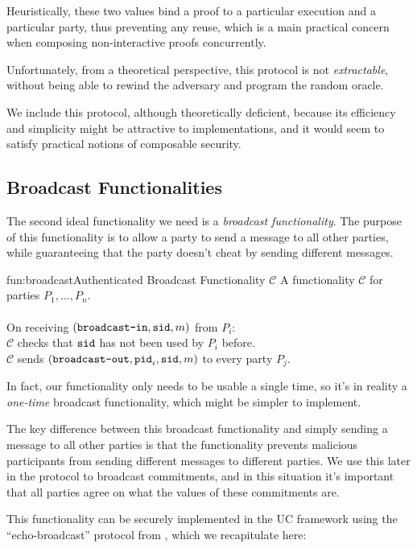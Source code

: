 Heuristically, these two values bind a proof to a particular execution
and a particular party, thus preventing any reuse,
which is a main practical concern when composing non-interactive
proofs concurrently.

Unfortunately, from a theoretical perspective, this protocol
is not \emph{extractable}, without being able to rewind the adversary
and program the random oracle.

We include this protocol, although theoretically deficient,
because its efficiency and simplicity might be attractive
to implementations, and it would seem to satisfy practical
notions of composable security.

\subsection{Broadcast Functionalities}

The second ideal functionality we need is a \emph{broadcast functionality}.
The purpose of this functionality is to allow a party to send a message
to all other parties, while guaranteeing that the party doesn't cheat
by sending different messages.

\begin{afunctionality}{fun:broadcast}{Authenticated Broadcast Functionality $\mathcal{C}$}
A functionality $\mathcal{C}$ for parties $P_1, \ldots, P_n$.\\
\\
On receiving $(\texttt{broadcast-in}, \texttt{sid}, m)$ from $P_i$:\\
$\mathcal{C}$ checks that $\texttt{sid}$ has not been used by $P_i$ before.\\
$\mathcal{C}$ sends $(\texttt{broadcast-out}, \texttt{pid}_i, \texttt{sid}, m)$ to every party $P_j$.
\end{afunctionality}

In fact, our functionality only needs to be usable a single time, so it's
in reality a \emph{one-time} broadcast functionality, which might be simpler
to implement.

The key difference between this broadcast functionality and simply sending
a message to all other parties is that the functionality prevents malicious
participants from sending different messages to different parties.
We use this later in the protocol to broadcast commitments, and in this
situation it's important that all parties agree on what the values of
these commitments are.

This functionality can be securely implemented
in the UC framework using the ``echo-broadcast'' protocol from
\cite{goldwasser_secure_2005}, which we recapitulate here:


